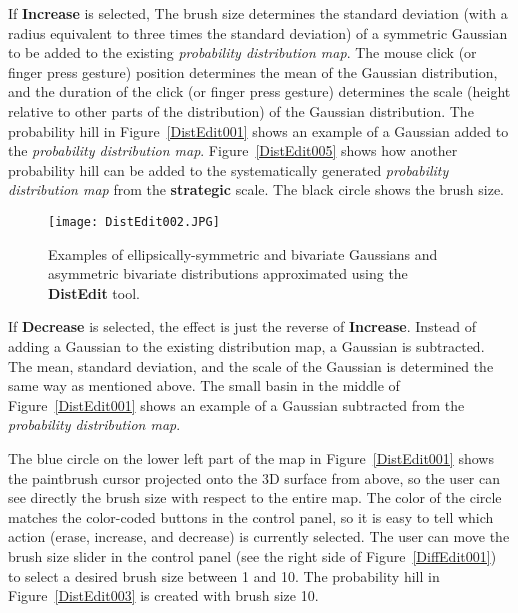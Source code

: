 If \textbf{Increase} is selected, The brush size determines the standard deviation (with a radius equivalent to three times the standard deviation) of a symmetric Gaussian to be added to the existing \textit{probability distribution map}. The mouse click (or finger press gesture) position determines the mean of the Gaussian distribution, and the duration of the click (or finger press gesture) determines the scale (height relative to other parts of the distribution) of the Gaussian distribution. The probability hill in Figure~\ref{DistEdit001} shows an example of a Gaussian added to the \textit{probability distribution map}. Figure~\ref{DistEdit005} shows how another probability hill can be added to the systematically generated \textit{probability distribution map} from the \textbf{strategic} scale. The black circle shows the brush size.

\begin{figure}
\centering
\texttt{[image: DistEdit002.JPG]}
\caption{Examples of ellipsically-symmetric and bivariate Gaussians and asymmetric bivariate distributions approximated using the \textbf{DistEdit} tool.}
\label{DistEdit002}
\end{figure}

If \textbf{Decrease} is selected, the effect is just the reverse of \textbf{Increase}. Instead of adding a Gaussian to the existing distribution map, a Gaussian is subtracted. The mean, standard deviation, and the scale of the Gaussian is determined the same way as mentioned above. The small basin in the middle of Figure~\ref{DistEdit001} shows an example of a Gaussian subtracted from the \textit{probability distribution map}.

The blue circle on the lower left part of the map in Figure~\ref{DistEdit001} shows the paintbrush cursor projected onto the 3D surface from above, so the user can see directly the brush size with respect to the entire map. The color of the circle matches the color-coded buttons in the control panel, so it is easy to tell which action (erase, increase, and decrease) is currently selected. The user can move the brush size slider in the control panel (see the right side of Figure~\ref{DiffEdit001}) to select a desired brush size between 1 and 10. The probability hill in Figure~\ref{DistEdit003} is created with brush size 10.

